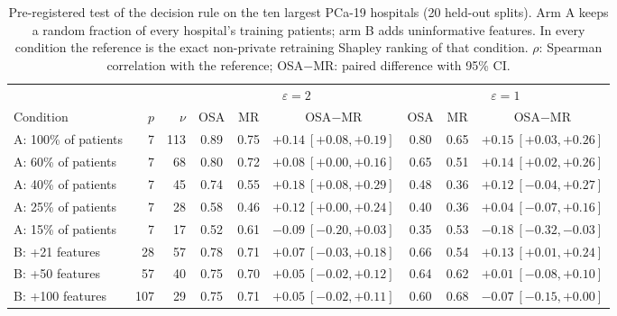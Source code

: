\begin{table}[t]
\caption{Pre-registered test of the decision rule on the ten largest PCa-19 hospitals (20 held-out splits). Arm A keeps a random fraction of every hospital's training patients; arm B adds uninformative features. In every condition the reference is the exact non-private retraining Shapley ranking of that condition. $\rho$: Spearman correlation with the reference; OSA$-$MR: paired difference with 95\% CI.}
\centering\small
\begin{tabular}{lrrcccccc}
\toprule
 & & & \multicolumn{3}{c}{$\varepsilon=2$} & \multicolumn{3}{c}{$\varepsilon=1$} \\
\cmidrule(lr){4-6}\cmidrule(lr){7-9}
Condition & $p$ & $\nu$ & OSA & MR & OSA$-$MR & OSA & MR & OSA$-$MR \\
\midrule
A: 100\% of patients & 7 & 113 & 0.89 & 0.75 & $+0.14\ [+0.08, +0.19]$ & 0.80 & 0.65 & $+0.15\ [+0.03, +0.26]$ \\
A: 60\% of patients & 7 & 68 & 0.80 & 0.72 & $+0.08\ [+0.00, +0.16]$ & 0.65 & 0.51 & $+0.14\ [+0.02, +0.26]$ \\
A: 40\% of patients & 7 & 45 & 0.74 & 0.55 & $+0.18\ [+0.08, +0.29]$ & 0.48 & 0.36 & $+0.12\ [\ensuremath{-}0.04, +0.27]$ \\
A: 25\% of patients & 7 & 28 & 0.58 & 0.46 & $+0.12\ [+0.00, +0.24]$ & 0.40 & 0.36 & $+0.04\ [\ensuremath{-}0.07, +0.16]$ \\
A: 15\% of patients & 7 & 17 & 0.52 & 0.61 & $-0.09\ [\ensuremath{-}0.20, +0.03]$ & 0.35 & 0.53 & $-0.18\ [\ensuremath{-}0.32, \ensuremath{-}0.03]$ \\
B: +21 features & 28 & 57 & 0.78 & 0.71 & $+0.07\ [\ensuremath{-}0.03, +0.18]$ & 0.66 & 0.54 & $+0.13\ [+0.01, +0.24]$ \\
B: +50 features & 57 & 40 & 0.75 & 0.70 & $+0.05\ [\ensuremath{-}0.02, +0.12]$ & 0.64 & 0.62 & $+0.01\ [\ensuremath{-}0.08, +0.10]$ \\
B: +100 features & 107 & 29 & 0.75 & 0.71 & $+0.05\ [\ensuremath{-}0.02, +0.11]$ & 0.60 & 0.68 & $-0.07\ [\ensuremath{-}0.15, +0.00]$ \\
\bottomrule
\end{tabular}
\label{tab:nu_sweep}
\end{table}
